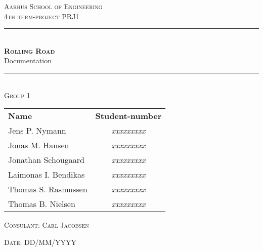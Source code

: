 \newcommand{\HRule}{\rule{\linewidth}{0.1mm}} %

\begin{center}
	
	\textsc{\LARGE Aarhus School of Engineering}\\[1.5cm] %
	
	\textsc{\large 4th term-project PRJ1}\\[2.5cm] 
	\HRule \\[0.8cm]
	{\huge \bfseries \textsc{Rolling Road}} \\[0.5cm]{\LARGE Documentation} \\[0.4cm]
	\HRule \\[1.5cm]
	
	\textsc{\large Group 1}\\
	\vspace{0.5 in}
	\begin{center}
		\begin{tabular}{l c}
			\textbf{Name} & \textbf{Student-number} \\
			Jens P. Nymann & \textsl{xxxxxxxxx} \\
			Jonas M. Hansen & \textsl{xxxxxxxxx} \\
			Jonathan Schougaard & \textsl{xxxxxxxxx} \\
			Laimonas I. Bendikas & \textsl{xxxxxxxxx} \\
			Thomas S. Rasmussen & \textsl{xxxxxxxxx} \\
			Thomas B. Nielsen & \textsl{xxxxxxxxx} \\
		\end{tabular}
	\end{center}
	\vspace{0.5 in}
	
	\textsc{\large Consulant: Carl Jacobsen}
	\vspace{0.5 in}
	
	\textsc{\large Date: DD/MM/YYYY}\\
	
\end{center} %

\newpage